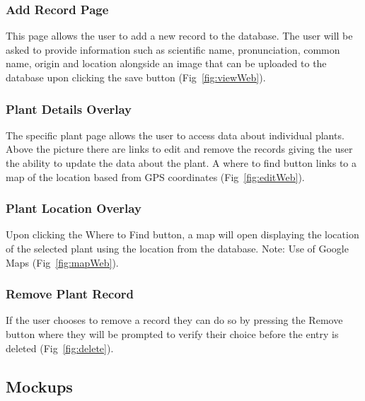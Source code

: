         \subsubsection{Add Record Page}
            This page allows the user to add a new record to the database. The user will be asked to provide information such as scientific name, pronunciation, common name, origin and location alongside an image that can be uploaded to the database upon clicking the save button (Fig~\ref{fig:viewWeb}). 
        
        \subsubsection{Plant Details Overlay}
            The specific plant page allows the user to access data about individual plants. Above the picture there are links to edit and remove the records giving the user the ability to update the data about the plant. A where to find button links to a map of the location based from GPS coordinates (Fig~\ref{fig:editWeb}).

        \subsubsection{Plant Location Overlay}
            Upon clicking the Where to Find button, a map will open displaying the location of the selected plant using the location from the database. Note: Use of Google Maps (Fig~\ref{fig:mapWeb}).

        \subsubsection{Remove Plant Record}
        If the user chooses to remove a record they can do so by pressing the Remove button where they will be prompted to verify their choice before the entry is deleted (Fig~\ref{fig:delete}).

    \subsection{Mockups}

